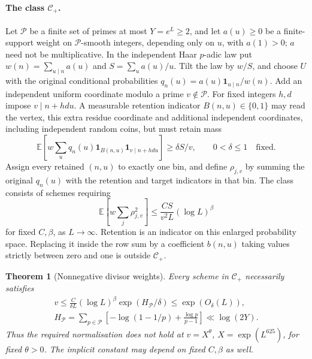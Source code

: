 \documentclass[11pt]{article}
\newtheorem{theorem}{Theorem}[section]
\theoremstyle{definition}
\newcommand{\E}{\mathbb E}
\newcommand{\ind}{\mathbf 1}
\theoremstyle{remark}
\numberwithin{equation}{section}
\begin{document}
\paragraph{The class $\mathcal C_+$.}\label{def:positive}
Let $\mathcal P$ be a finite set of primes at most $Y=e^L\ge2$, and let $a(u)\ge0$ be a finite-support weight
on $\mathcal P$-smooth integers, depending only on $u$, with $a(1)>0$; $a$ need not be multiplicative.
In the independent Haar $p$-adic law put
$w(n)=\sum_{u\mid n}a(u)$ and $S=\sum_u a(u)/u$.
Tilt the law by $w/S$, and choose $U$ with the original conditional probabilities
$q_n(u)=a(u)\ind_{u\mid n}/w(n)$.
Add an independent uniform coordinate modulo a prime $v\notin\mathcal P$.
For fixed integers $h,d$ impose $v\mid n+hdu$.
A measurable retention indicator $B(n,u)\in\{0,1\}$ may read the vertex, this extra residue coordinate
and additional independent coordinates, including independent random coins, but must retain mass
\begin{equation}\label{eq:positive-retention}
 \E\left[w\sum_u q_n(u)\ind_{B(n,u)}\ind_{v\mid n+hdu}\right]\ge\delta S/v,
 \qquad0<\delta\le1\quad\text{fixed}.
\end{equation}
Assign every retained $(n,u)$ to exactly one bin, and define $\rho_{j,v}$ by summing the original $q_n(u)$
with the retention and target indicators in that bin. The class consists of schemes requiring
\begin{equation}\label{eq:positive-required}
 \E\left[w\sum_j\rho_{j,v}^2\right]\le\frac{CS}{v^2L}(\log L)^\beta
\end{equation}
for fixed $C,\beta$, as $L\to\infty$.
Retention is an indicator on this enlarged probability space. Replacing it inside the row sum by a
coefficient $b(n,u)$ taking values strictly between zero and one is outside $\mathcal C_+$.
\begin{theorem}[Nonnegative divisor weights]\label{thm:positive}
Every scheme in $\mathcal C_+$ necessarily satisfies
\begin{equation}\label{eq:positive-v}
\begin{gathered}
 v\le\frac C{\delta L}(\log L)^\beta\exp(H_{\mathcal P}/\delta)\le\exp(O_\delta(L)),\\
 H_{\mathcal P}=\sum_{p\in\mathcal P}
 \left[-\log(1-1/p)+\frac{\log p}{p-1}\right]\ll\log(2Y).
\end{gathered}
\end{equation}
Thus the required normalisation does not hold at $v=X^\theta$, $X=\exp(L^{625})$, for fixed $\theta>0$.
The implicit constant may depend on fixed $C,\beta$ as well.
\end{theorem}
\end{document}
